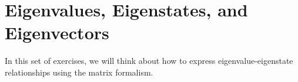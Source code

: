 %
%
%
%

\section*{Eigenvalues, Eigenstates, and Eigenvectors}

	In this set of exercises, we will think about how to express eigenvalue-eigenstate relationships using the matrix formalism.
	
